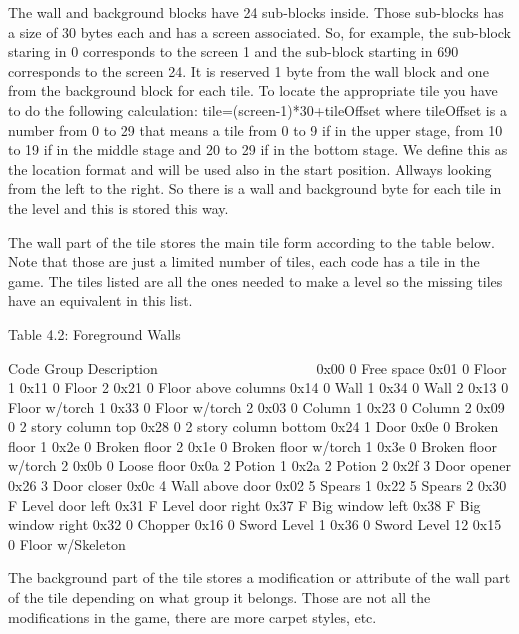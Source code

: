  The wall and background blocks have 24 sub-blocks inside. Those sub-blocks
 has a size of 30 bytes each and has a screen associated. So, for example,
 the sub-block staring in 0 corresponds to the screen 1 and the sub-block
 starting in 690 corresponds to the screen 24. 
 It is reserved 1 byte from the wall block and one from the background
 block for each tile. To locate the appropriate tile you have to do the
 following calculation: tile=(screen-1)*30+tileOffset where tileOffset is a
 number
 from 0 to 29 that means a tile from 0 to 9 if in the upper stage, from
 10 to 19 if in the middle stage and 20 to 29 if in the bottom stage.
 We define this as the location format and will be used also in the start
 position.
 Allways looking from the left to the right.
 So there is a wall and background byte for each tile in the level and this
 is stored this way.

 The wall part of the tile stores the main tile form according to the table
 below. Note that those are just a limited number of tiles, each code has a
 tile in the game. The tiles listed are all the ones needed to make a level
 so the missing tiles have an equivalent in this list.

                   Table 4.2: Foreground Walls
                   ~~~~~~~~~~~~~~~~~~~~~~~~~~~

  Code Group Description
  ~~~~ ~~~~~ ~~~~~~~~~~~
  0x00 0     Free space
  0x01 0     Floor 1
  0x11 0     Floor 2
  0x21 0     Floor above columns
  0x14 0     Wall 1
  0x34 0     Wall 2
  0x13 0     Floor w/torch 1  
  0x33 0     Floor w/torch 2     
  0x03 0     Column 1   
  0x23 0     Column 2   
  0x09 0     2 story column top
  0x28 0     2 story column bottom
  0x24 1     Door
  0x0e 0     Broken floor 1
  0x2e 0     Broken floor 2
  0x1e 0     Broken floor w/torch 1
  0x3e 0     Broken floor w/torch 2
  0x0b 0     Loose floor
  0x0a 2     Potion 1
  0x2a 2     Potion 2    
  0x2f 3     Door opener
  0x26 3     Door closer
  0x0c 4     Wall above door
  0x02 5     Spears 1
  0x22 5     Spears 2
  0x30 F     Level door left
  0x31 F     Level door right
  0x37 F     Big window left
  0x38 F     Big window right
  0x32 0     Chopper
  0x16 0     Sword Level 1
  0x36 0     Sword Level 12
  0x15 0     Floor w/Skeleton
  
 The background part of the tile stores a modification or attribute of the
 wall part of the tile depending on what group it belongs. Those are not
 all the modifications in the game, there are more carpet styles, etc.


